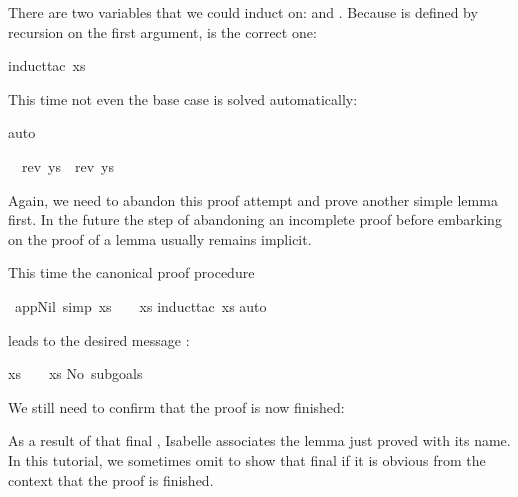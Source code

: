 \begin{isabellebody}
\begin{isamarkuptxt}
There are two variables that we could induct on:  and
. Because \isa{{\isacharat}} is defined by recursion on
the first argument,  is the correct one:%
\end{isamarkuptxt}%
induct{\isacharunderscore}tac\ xs{\isacharparenright}%
\begin{isamarkuptxt}%
\noindent
This time not even the base case is solved automatically:%
\end{isamarkuptxt}%
auto{\isacharparenright}%
\begin{isamarkuptxt}%
\begin{isabelle}%
\ {}{\isachardot}\ rev\ ys\ {\isacharequal}\ rev\ ys\ {\isacharat}\ {\isacharbrackleft}{\isacharbrackright}%
\end{isabelle}
Again, we need to abandon this proof attempt and prove another simple lemma
first. In the future the step of abandoning an incomplete proof before
embarking on the proof of a lemma usually remains implicit.%
\end{isamarkuptxt}%
%
%
\begin{isamarkuptext}%
This time the canonical proof procedure%
\end{isamarkuptext}%
\ app{\isacharunderscore}Nil{}\ {\isacharbrackleft}simp{\isacharbrackright}{\isacharcolon}\ {\isachardoublequote}xs\ {\isacharat}\ {\isacharbrackleft}{\isacharbrackright}\ {\isacharequal}\ xs{\isachardoublequote}\isanewline
{}induct{\isacharunderscore}tac\ xs{\isacharparenright}\isanewline
{}auto{\isacharparenright}%
\begin{isamarkuptxt}%
\noindent
leads to the desired message :
\begin{isabelle}%
xs\ {\isacharat}\ {\isacharbrackleft}{\isacharbrackright}\ {\isacharequal}\ xs\isanewline
No\ subgoals{\isacharbang}%
\end{isabelle}
We still need to confirm that the proof is now finished:%
\end{isamarkuptxt}%
%
\begin{isamarkuptext}%
\noindent
As a result of that final , Isabelle associates the lemma just proved
with its name. In this tutorial, we sometimes omit to show that final 
if it is obvious from the context that the proof is finished.


\end{isamarkuptext}
\end{isabellebody}

